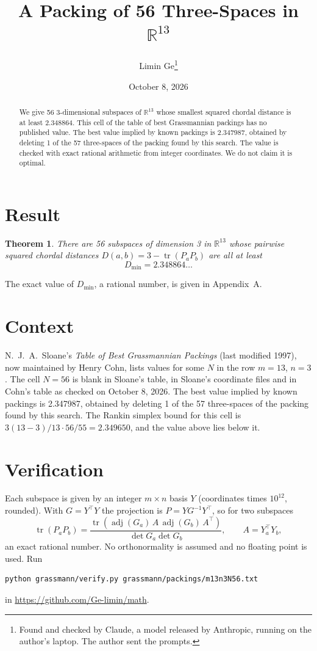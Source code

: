 \documentclass[11pt,a4paper]{article}
\title{A Packing of 56 Three-Spaces in $\mathbb{R}^{13}$}
\author{Limin Ge\thanks{Found and checked by Claude, a model released by Anthropic, running on the author's laptop. The author sent the prompts.}}
\date{October 8, 2026}
\newtheorem*{theorem}{Theorem}
\begin{document}
\maketitle
\begin{abstract}
We give 56 3-dimensional subspaces of $\mathbb{R}^{13}$ whose smallest squared chordal distance is at least 2.348864. This cell of the table of best Grassmannian packings has no published value. The best value implied by known packings is 2.347987, obtained by deleting 1 of the 57 three-spaces of the packing found by this search. The value is checked with exact rational arithmetic from integer coordinates. We do not claim it is optimal.
\end{abstract}

\section{Result}
\begin{theorem}
There are 56 subspaces of dimension 3 in $\mathbb{R}^{13}$ whose pairwise squared chordal distances $D(a,b) = 3 - \operatorname{tr}(P_aP_b)$ are all at least
\[ D_{\min} = 2.348864\ldots \]
\end{theorem}
The exact value of $D_{\min}$, a rational number, is given in Appendix~A.


\section{Context}
N.~J.~A.~Sloane's \emph{Table of Best Grassmannian Packings} (last modified 1997), now maintained by Henry Cohn, lists values for some $N$ in the row $m=13$, $n=3$. The cell $N=56$ is blank in Sloane's table, in Sloane's coordinate files and in Cohn's table as checked on October 8, 2026. The best value implied by known packings is 2.347987, obtained by deleting 1 of the 57 three-spaces of the packing found by this search. The Rankin simplex bound for this cell is $3(13-3)/13\cdot 56/55 = 2.349650$, and the value above lies below it.


\section{Verification}
Each subspace is given by an integer $m\times n$ basis $Y$ (coordinates times $10^{12}$, rounded). With $G=Y^\top Y$ the projection is $P=YG^{-1}Y^\top$, so for two subspaces
\[ \operatorname{tr}(P_aP_b)=\frac{\operatorname{tr}(\operatorname{adj}(G_a)\,A\,\operatorname{adj}(G_b)\,A^\top)}{\det G_a\det G_b},\qquad A=Y_a^\top Y_b, \]
an exact rational number. No orthonormality is assumed and no floating point is used. Run
\begin{verbatim}
python grassmann/verify.py grassmann/packings/m13n3N56.txt
\end{verbatim}
in \url{https://github.com/Ge-limin/math}.
\end{document}
